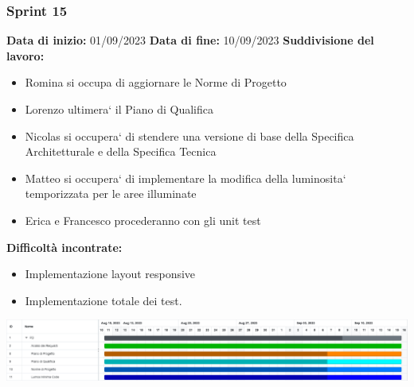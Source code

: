 \documentclass[a4paper, 12pt]{article}
\begin{document}
\subsubsection{Sprint 15}
\textbf{Data di inizio:} 01/09/2023\newline
\textbf{Data di fine:} 10/09/2023\newline
\newline
\textbf{Suddivisione del lavoro:}
\begin{itemize}
	\item Romina si occupa di aggiornare le Norme di Progetto
	\item Lorenzo ultimera` il Piano di Qualifica 
	\item Nicolas si occupera` di stendere una versione di base della Specifica Architetturale e della Specifica Tecnica
	\item Matteo si occupera` di implementare la modifica della luminosita` temporizzata per le aree illuminate
	\item Erica e Francesco procederanno con gli unit test
\end{itemize}
\textbf{Difficoltà incontrate:}
\begin{itemize}
	\item Implementazione layout responsive
	\item Implementazione totale dei test.
\end{itemize}
\includegraphics[scale=0.178]{PB_3.png}\newline
\newline
\end{document}
